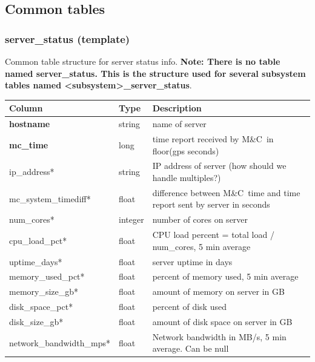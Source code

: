 \documentclass{article}
\newcommand{\mc}{M\&C}
\begin{document}
{\subsection{Common tables}
\subsubsection{server\_status (template)}
\label{sec:server_status}
Common table structure for server status info. \textbf{Note: There is no table named server\_status. This is the structure used for several subsystem tables named \textless subsystem\textgreater\_server\_status}.
\begin{center}
 \begin{tabular}{| p{4cm} | p{2cm} | p{10cm} |}
\hline
 {\bf Column} & {\bf Type}  & {\bf Description} \\ [0.5ex]  \hline\hline
 \textbf{hostname} & string &  name of server \\ \hline
 \textbf{mc\_time} & long & time report received by \mc\ in floor(gps seconds) \\ \hline
 ip\_address* & string & IP address of server (how should we handle multiples?) \\\hline
mc\_system\_timediff* & float & difference between \mc\ time and time report sent by server in seconds \\\hline
num\_cores* & integer & number of cores on server \\\hline
cpu\_load\_pct* & float & CPU load percent = total load / num\_cores, 5 min average  \\\hline
uptime\_days* & float & server uptime in days  \\\hline
memory\_used\_pct* & float & percent of memory used, 5 min average  \\\hline
memory\_size\_gb* & float & amount of memory on server in GB \\\hline
disk\_space\_pct* & float & percent of disk used  \\\hline
disk\_size\_gb* & float & amount of disk space on server in GB \\\hline
network\_bandwidth\_mps* & float & Network bandwidth in MB/s, 5 min average. Can be null \\\hline
\end{tabular}
\end{center}

}
\end{document}
